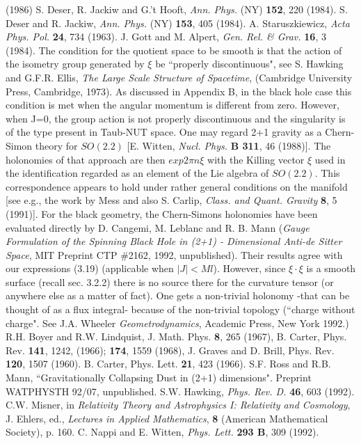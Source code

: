 \begin{thebibliography}{20}
 (1986)
S. Deser, R. Jackiw and G.'t Hooft, {\it Ann. Phys.} (NY)
{\bf 152},
 220 (1984). S. Deser and R. Jackiw, {\it Ann. Phys.} (NY) {\bf 153}, 405
 (1984). A. Staruszkiewicz, {\it Acta Phys. Pol.} {\bf 24}, 734 (1963).
J. Gott and M. Alpert, {\it Gen. Rel. \& Grav.} {\bf 16}, 3 (1984).
The condition for the quotient space to be smooth is that the
action
 of the isometry group generated by $\xi$ be ``properly discontinuous", see S.
 Hawking and G.F.R. Ellis, {\it The Large Scale Structure of Spacetime},
 (Cambridge University Press, Cambridge, 1973). As discussed in Appendix B, in
 the black hole case this condition is met when the angular momentum is
 different from zero. However, when J=0, the group action is not properly
 discontinuous and the singularity is of the type present in Taub-NUT space.
One may regard 2+1 gravity as a Chern-Simon theory for $SO (2.2)$
[E. Witten, {\it Nucl. Phys.} {\bf B 311}, 46 (1988)]. The holonomies of that
 approach are then $exp 2 \pi n \xi$ with the Killing vector $\xi$ used in the
 identification regarded as an element of the Lie algebra of $SO(2.2)$. This
 correspondence appears to hold under rather general conditions on the
manifold
 [see e.g., the work by Mess\cite{4} and also S. Carlip, {\it Class. and
Quant. Gravity} {\bf 8}, 5 (1991)]. For the black geometry, the Chern-Simons
 holonomies have been evaluated directly by D. Cangemi, M. Leblanc and R. B.
 Mann ({\it Gauge Formulation of the Spinning Black Hole in (2+1) -
Dimensional
 Anti-de Sitter Space}, MIT Preprint CTP \#2162, 1992, unpublished). Their
 results agree with our expressions (3.19) (applicable when $ \vert J \vert <
Ml$).  However, since $\xi \cdot \xi$ is a smooth surface (recall sec.
3.2.2) there is no source there for the curvature tensor (or anywhere else
as a matter of fact).  One gets a non-trivial holonomy  -that can be thought
of as a flux integral- because of the non-trivial topology
(``charge without charge".  See J.A. Wheeler {\it
Geometrodynamics}, Academic Press, New York 1992.)
R.H. Boyer and R.W. Lindquist, J. Math. Phys. {\bf 8}, 265 (1967),
B.
 Carter, Phys. Rev. {\bf 141}, 1242, (1966); {\bf 174}, 1559 (1968), J. Graves
 and D. Brill, Phys. Rev. {\bf 120}, 1507 (1960).
B. Carter, Phys. Lett. {\bf 21}, 423 (1966).
 S.F. Ross and R.B. Mann, ``Gravitationally Collapsing Dust in
(2+1) dimensions". Preprint WATPHYSTH 92/07, unpublished.
 S.W. Hawking, {\it Phys. Rev. D.} {\bf 46}, 603 (1992).
C.W. Misner, in {\it Relativity Theory and Astrophysics I:
Relativity
 and Cosmology}, J. Ehlers, ed., {\it Lectures in Applied Mathematics},
{\bf 8}
 (American Mathematical Society), p. 160.
C. Nappi and E. Witten, {\it Phys. Lett.} {\bf 293 B}, 309 (1992).


\end{thebibliography}

